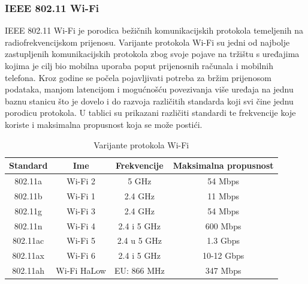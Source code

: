 \documentclass[times, utf8, diplomski]{fer}
\begin{document}
\subsubsection{IEEE 802.11 Wi-Fi}
IEEE 802.11 Wi-Fi je porodica bežičnih komunikacijskih protokola temeljenih na radiofrekvencijskom prijenosu. Varijante protokola Wi-Fi su jedni od najbolje zastupljenih komunikacijskih protokola zbog svoje pojave na tržištu s uređajima kojima je cilj bio mobilna uporaba poput prijenosnih računala i mobilnih telefona. Kroz godine se počela pojavljivati potreba za bržim prijenosom podataka, manjom latencijom i mogućnošću povezivanja više uređaja na jednu baznu stanicu  što je dovelo i do razvoja različitih standarda koji svi čine jednu porodicu protokola. U tablici su prikazani različiti standardi te frekvencije koje koriste i maksimalna propusnost koja se može postići.
\begin{table}[H]
    \centering
    \caption{Varijante protokola Wi-Fi}
    \begin{tabular}{| c | c | c | c |} 
    \hline
    \textbf{Standard} & \textbf{Ime} & \textbf{Frekvencije} & \textbf{Maksimalna propusnost}\\
    \hline\hline
    802.11a & Wi-Fi 2 & 5 GHz & 54 Mbps\\
    \hline
    802.11b & Wi-Fi 1 & 2.4 GHz & 11 Mbps\\ 
    \hline
    802.11g & Wi-Fi 3 & 2.4 GHz & 54 Mbps\\ 
    \hline
    802.11n & Wi-Fi 4 & 2.4 i 5 GHz & 600 Mbps\\ 
    \hline
    802.11ac & Wi-Fi 5 & 2.4 u 5 GHz & 1.3 Gbps \\ 
    \hline
    802.11ax & Wi-Fi 6 & 2.4 i 5 GHz & 10-12 Gbps\\ 
    \hline
    802.11ah & Wi-Fi HaLow & EU: 866 MHz & 347 Mbps\\ 
    \hline
    \end{tabular}
    \label{tab:wifi}
\end{table}
\end{document}
